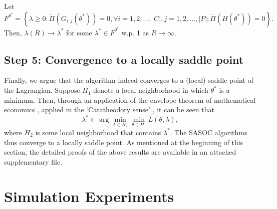 \documentclass[11pt,letterpaper,english]{article}
\begin{document}
\begin{theorem}
\label{theorem:sasoc-g-lambda}
Let $F^{\theta^*} =
\left \{ \lambda \ge 0 : \check\Pi \left ( G_{i, j}(\theta^*) \right ) = 0,
\forall
i = 1, 2, \dots, |C|, j = 1, 2, \dots, |P|; \check\Pi \left ( H(\theta^*) \right
)
= 0 \right \}.$ Then, $\lambda(R) \rightarrow \lambda^*$ for some $\lambda^*
\in F^{\theta^*}$ w.p. 1 as $R \rightarrow \infty$.
\end{theorem}

\subsection*{Step 5: Convergence to a locally saddle point}

Finally, we argue that the algorithm indeed converges to a (local) saddle
point of the Lagrangian.
Suppose $H_1$ denote a local neighborhood in which $\theta^*$ is
a minimum. Then, through an application of the envelope theorem of mathematical economics \citep[pp.
964-966]{mas1995microeconomic}, applied in the `Caratheodory sense' \citep[Lemma 4.3, pp.211]{borkar2005actor},
it can be seen that
\[\lambda^* \in \arg\min_{\lambda\in H_2} \min_{\theta\in H_1} L(\theta,\lambda),\]
where $H_2$ is some local neighborhood that contains $\lambda^*$.
The SASOC algorithms thus converge to a locally saddle point. As mentioned
at the beginning of this section, the detailed proofs of the above results
are available in an attached supplementary file.

\section{Simulation Experiments}
\label{sec:simulation}
\end{document}
